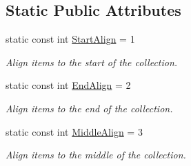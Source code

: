 \subsection*{Static Public Attributes}
\begin{DoxyCompactItemize}
\item 
\hypertarget{class_u_i_1_1_item_collection_widget_a8337446f599a744ce16901a346f5a3e2}{static const int \hyperlink{class_u_i_1_1_item_collection_widget_a8337446f599a744ce16901a346f5a3e2}{Start\-Align} = 1}\label{class_u_i_1_1_item_collection_widget_a8337446f599a744ce16901a346f5a3e2}

\begin{DoxyCompactList}\small\item\em Align items to the start of the collection. \end{DoxyCompactList}\item 
\hypertarget{class_u_i_1_1_item_collection_widget_a6833d42fa0d449b14a342dfa6abe5a04}{static const int \hyperlink{class_u_i_1_1_item_collection_widget_a6833d42fa0d449b14a342dfa6abe5a04}{End\-Align} = 2}\label{class_u_i_1_1_item_collection_widget_a6833d42fa0d449b14a342dfa6abe5a04}

\begin{DoxyCompactList}\small\item\em Align items to the end of the collection. \end{DoxyCompactList}\item 
\hypertarget{class_u_i_1_1_item_collection_widget_ab4a67d4d1320ee151a56ea94af0c482a}{static const int \hyperlink{class_u_i_1_1_item_collection_widget_ab4a67d4d1320ee151a56ea94af0c482a}{Middle\-Align} = 3}\label{class_u_i_1_1_item_collection_widget_ab4a67d4d1320ee151a56ea94af0c482a}

\begin{DoxyCompactList}\small\item\em Align items to the middle of the collection. \end{DoxyCompactList}\end{DoxyCompactItemize}
